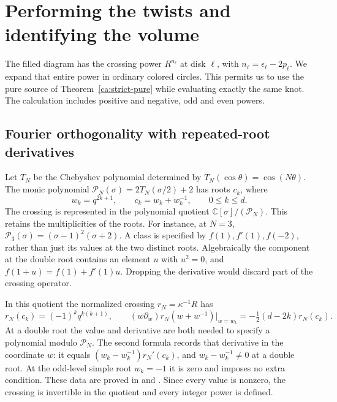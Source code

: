 \section{Performing the twists and identifying the volume}\label{ca:filling}

The filled diagram has the crossing power $R^{n_\ell}$ at disk
$\ell$, with $n_\ell=\epsilon_\ell-2p_\ell$. We expand that entire
power in ordinary colored circles. This permits us to use the pure
source of Theorem~\ref{ca:strict-pure} while evaluating exactly the
same knot. The calculation includes positive and negative, odd and
even powers.

\subsection{Fourier orthogonality with repeated-root derivatives}

Let $T_N$ be the Chebyshev polynomial determined by
$T_N(\cos\theta)=\cos(N\theta)$. The monic polynomial
$\mathscr P_N(\sigma)=2T_N(\sigma/2)+2$ has roots $c_k$, where
\[
 w_k=q^{2k+1},\qquad c_k=w_k+w_k^{-1},\qquad 0\le k\le d.
\]
The crossing is represented in the polynomial quotient
$\mathbb C[\sigma]/(\mathscr P_N)$. This retains the multiplicities
of the roots. For instance, at $N=3$,
$\mathscr P_3(\sigma)=(\sigma-1)^2(\sigma+2)$. A class is
specified by $f(1),f'(1),f(-2)$, rather than just its values at the
two distinct roots. Algebraically the component at the double root
contains an element $u$ with $u^2=0$, and
$f(1+u)=f(1)+f'(1)u$. Dropping the derivative would discard part
of the crossing operator.

In this quotient the normalized crossing $r_N=\kappa^{-1}R$ has
\begin{equation}\label{ca:crossing-data}
 r_N(c_k)=(-1)^kq^{k(k+1)},\qquad
 (w\partial_w)r_N(w+w^{-1})\big|_{w=w_k}
      =-\tfrac12(d-2k)r_N(c_k).
\end{equation}
At a double root the value and derivative are both needed to specify
a polynomial modulo $\mathscr P_N$. The second formula records that
derivative in the coordinate $w$: it equals
$(w_k-w_k^{-1})r_N'(c_k)$, and $w_k-w_k^{-1}\ne0$ at a
double root. At the odd-level simple root
$w_k=-1$ it is zero and imposes no extra condition. These data are
proved in \cite[Proposition 5.1]{Finite} and
\cite[equation (4.8)]{Newton}. Since every value is nonzero, the
crossing is invertible in the quotient and every integer power is
defined.

